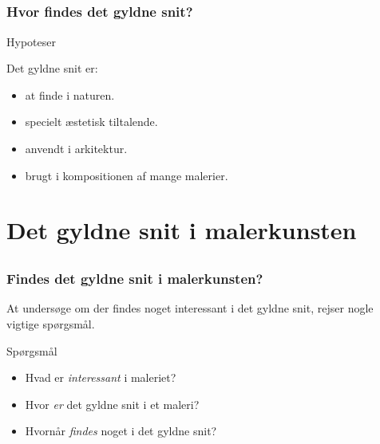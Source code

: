 \documentclass[xcolor=table]{beamer}
\begin{document}
\subsection*{}
\begin{frame}

    \frametitle{Hvor findes det gyldne snit?}

    \begin{block}{Hypoteser}

        Det gyldne snit er:

        \begin{itemize}
            \item <1> at finde i naturen.
            \item <1> specielt æstetisk tiltalende.
            \item <1> anvendt i arkitektur.
            \item <1-2> brugt i kompositionen af mange malerier.
        \end{itemize}

    \end{block}


\end{frame}

\section{Det gyldne snit i malerkunsten}

\subsection*{}
\begin{frame}

    \frametitle{Findes det gyldne snit i malerkunsten?}

    At undersøge om der findes noget interessant i det gyldne snit,
    rejser nogle vigtige spørgsmål.

    \hspace{8em}

    \begin{block}{Spørgsmål}

        \begin{itemize}
            \item Hvad er \emph{interessant} i maleriet?
            \item Hvor \emph{er} det gyldne snit i et maleri?
            \item Hvornår \emph{findes} noget i det gyldne snit?
        \end{itemize}

    \end{block}

\end{frame}
\end{document}
